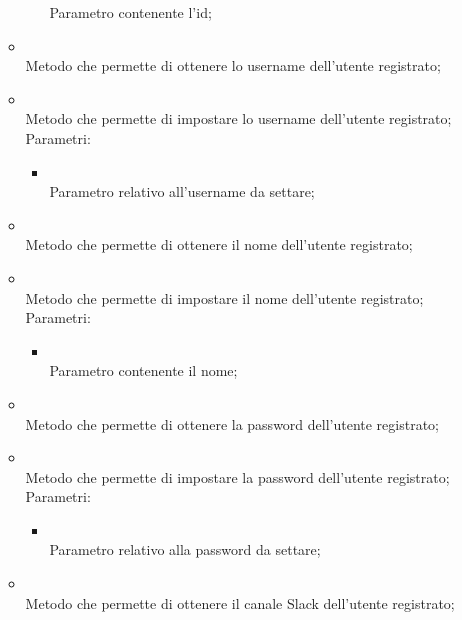 \begin{itemize}
\begin{itemize}
\begin{itemize}
			Parametro contenente l'id;
		\end{itemize}
		\item[]  \\		Metodo che permette di ottenere lo username dell'utente registrato;\\
		\item[]  \\		Metodo che permette di impostare lo username dell'utente registrato;\\
		Parametri:
		\begin{itemize}
			\item {} \\
			Parametro relativo all'username da settare;
		\end{itemize}
		\item[]  \\		Metodo che permette di ottenere il nome dell'utente registrato;\\
		\item[]  \\		Metodo che permette di impostare il nome dell'utente registrato;\\
		Parametri:
		\begin{itemize}
			\item {} \\
			Parametro contenente il nome;
		\end{itemize}
		\item[]  \\		Metodo che permette di ottenere la password dell'utente registrato;\\
		\item[]  \\		Metodo che permette di impostare la password dell'utente registrato;\\
		Parametri:
		\begin{itemize}
			\item {} \\
			Parametro relativo alla password da settare;
		\end{itemize}
		\item[]  \\		Metodo che permette di ottenere il canale Slack dell'utente registrato;\\

\end{itemize}
\end{itemize}

